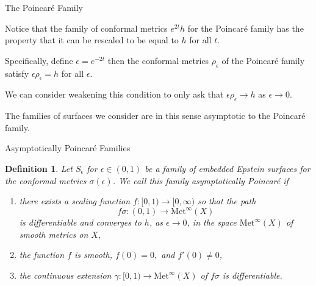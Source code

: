 \documentclass[professionalfont]{beamer}
\newtheorem{defn}{Definition}
\begin{document}


\begin{frame}{The Poincar\'e Family}

Notice that the family of conformal metrics $e^{2t}h$ for the Poincar\'e family has the property that it can be rescaled to be equal to $h$ for all $t$. \pause
\newline

Specifically, define $\epsilon = e^{-2t}$ then the conformal metrics $\rho_\epsilon$ of the Poincar\'e family satisfy $\epsilon \rho_\epsilon = h$ for all $\epsilon$. \pause
\newline

We can consider weakening this condition to only ask that $\epsilon \rho_\epsilon \to h$ as $\epsilon \to 0$. \pause
\newline

The families of surfaces we consider are in this sense asymptotic to the Poincar\'e family.


\end{frame}



\begin{frame}{Asymptotically Poincar\'e Families}

\begin{defn}
\label{asym-def}
Let $S_\epsilon$ for $\epsilon \in (0,1)$ be a family of embedded Epstein surfaces for the conformal metrics $\sigma(\epsilon)$. 
We call this family \emph{asymptotically Poincar\'e} if \pause
\begin{enumerate}
    \item there exists a scaling function $f:[0,1) \to [0,\infty)$ so that the path
    \[
f\sigma:(0,1) \to \mathrm{Met}^\infty(X)
\]
is differentiable and converges to $h$, as $\epsilon \to 0$, in the space $\mathrm{Met}^\infty(X)$ of smooth metrics on $X$, \pause
    \item the function $f$ is smooth, $f(0) = 0,$ and $f'(0) \neq 0$, \pause
    \item the continuous extension $\gamma:[0,1) \to \mathrm{Met}^\infty(X)$ of $f \sigma$ is differentiable.
\end{enumerate}

\end{defn}

\end{frame}


\end{document}
